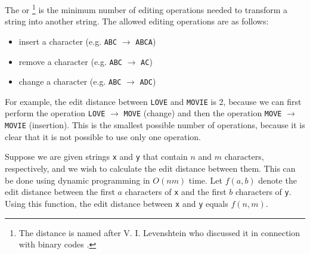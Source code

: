 The  or \footnote{The distance
is named after V. I. Levenshtein who discussed it in connection with binary codes \cite{lev66}.}
is the minimum number of editing operations
needed to transform a string
into another string.
The allowed editing operations are as follows:
\begin{itemize}
\item insert a character (e.g. \texttt{ABC} $\rightarrow$ \texttt{ABCA})
\item remove a character (e.g. \texttt{ABC} $\rightarrow$ \texttt{AC})
\item change a character (e.g. \texttt{ABC} $\rightarrow$ \texttt{ADC})
\end{itemize}

For example, the edit distance between
\texttt{LOVE} and \texttt{MOVIE} is 2,
because we can first perform the operation
 \texttt{LOVE} $\rightarrow$ \texttt{MOVE}
(change) and then the operation
\texttt{MOVE} $\rightarrow$ \texttt{MOVIE}
(insertion).
This is the smallest possible number of operations,
because it is clear that it is not possible
to use only one operation.

Suppose we are given strings
\texttt{x} and \texttt{y} that contain
$n$ and $m$ characters, respectively,
and we wish to calculate the edit distance
between them.
This can be done using
dynamic programming in $O(nm)$ time.
Let $f(a,b)$ denote the edit distance
between the first $a$ characters of \texttt{x}
and the first $b$ characters of \texttt{y}.
Using this function, the edit distance between
\texttt{x} and \texttt{y} equals $f(n,m)$.

